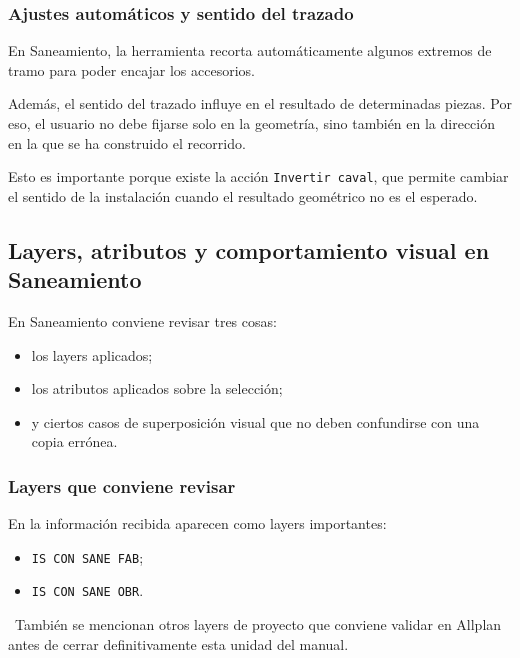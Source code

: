 \subsubsection{Ajustes automáticos y sentido del trazado}

En Saneamiento, la herramienta recorta automáticamente algunos extremos de tramo para poder encajar los accesorios.

Además, el sentido del trazado influye en el resultado de determinadas piezas. Por eso, el usuario no debe fijarse solo en la geometría, sino también en la dirección en la que se ha construido el recorrido.

Esto es importante porque existe la acción \texttt{Invertir caval}, que permite cambiar el sentido de la instalación cuando el resultado geométrico no es el esperado.


\subsection{Layers, atributos y comportamiento visual en Saneamiento}

En Saneamiento conviene revisar tres cosas:

\begin{itemize}
\item los layers aplicados;
\item los atributos aplicados sobre la selección;
\item y ciertos casos de superposición visual que no deben confundirse con una copia errónea.
\end{itemize}

\subsubsection{Layers que conviene revisar}

En la información recibida aparecen como layers importantes:

\begin{itemize}
\item \texttt{IS CON SANE FAB};
\item \texttt{IS CON SANE OBR}.
\end{itemize}

\pendingtag\ También se mencionan otros layers de proyecto que conviene validar en Allplan antes de cerrar definitivamente esta unidad del manual.

